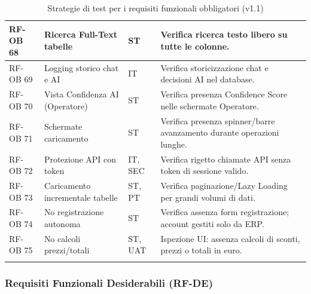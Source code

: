 \documentclass[a4paper,11pt,oneside]{scrartcl}
\begin{document}
\begin{longtable}{|p{1.5cm}|p{4.5cm}|p{1.8cm}|p{6cm}|}
RF-OB 68 & Ricerca Full-Text tabelle & ST & Verifica ricerca testo libero su tutte le colonne. \\ \hline
RF-OB 69 & Logging storico chat e AI & IT & Verifica storicizzazione chat e decisioni AI nel database. \\ \hline
RF-OB 70 & Vista Confidenza AI (Operatore) & ST & Verifica presenza Confidence Score nelle schermate Operatore. \\ \hline
RF-OB 71 & Schermate caricamento & ST & Verifica presenza spinner/barre avanzamento durante operazioni lunghe. \\ \hline
RF-OB 72 & Protezione API con token & IT, SEC & Verifica rigetto chiamate API senza token di sessione valido. \\ \hline
RF-OB 73 & Caricamento incrementale tabelle & ST, PT & Verifica paginazione/Lazy Loading per grandi volumi di dati. \\ \hline
RF-OB 74 & No registrazione autonoma & ST & Verifica assenza form registrazione; account gestiti solo da ERP. \\ \hline
RF-OB 75 & No calcoli prezzi/totali & ST, UAT & Ispezione UI: assenza calcoli di sconti, prezzi o totali in euro. \\ \hline
\caption{Strategie di test per i requisiti funzionali obbligatori (v1.1)}
\end{longtable}

\newpage
\subsubsection{Requisiti Funzionali Desiderabili (RF-DE)}
\end{document}
